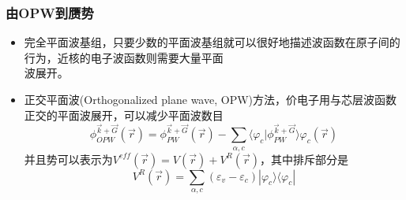 
\frame
{
\frametitle{由OPW到赝势}
\begin{itemize}
\setlength{\itemsep}{5pt}
	\item 完全平面波基组，只要少数的平面波基组就可以很好地描述波函数在原子间的行为，近核的电子波函数则需要大量平面\\波展开。%
	\item 正交平面波(\textrm{Orthogonalized plane wave, OPW})方法，价电子用与芯层波函数正交的平面波展开，可以减少平面波数目
		\begin{displaymath}
			\phi_{OPW}^{\vec k+\vec G}(\vec r)=\phi_{PW}^{\vec k+\vec G}(\vec r)-\sum_{\alpha,c}\langle\varphi_c|\phi_{PW}^{\vec k+\vec G}\rangle\varphi_c(\vec r)
		\end{displaymath}
		并且势可以表示为$V^{eff}(\vec r)=V(\vec r)+V^R(\vec r)$，其中排斥部分是$$V^R(\vec r)=\sum_{\alpha,c}(\varepsilon_v-\varepsilon_c)|\varphi_c\rangle\langle\varphi_c|$$
\end{itemize}
}

